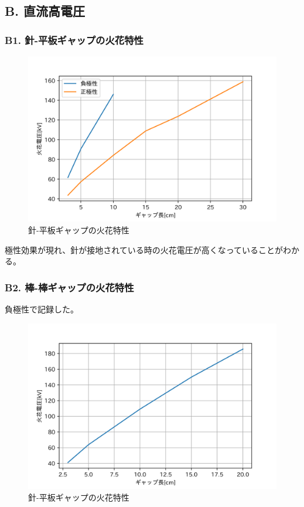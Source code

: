 \documentclass[dvipdfmx, twocolumn]{jsarticle}
\begin{document}
\subsection*{B. 直流高電圧}

\subsubsection*{B1. 針-平板ギャップの火花特性}
\begin{figure}[H]
\begin{center}
\includegraphics[scale = 0.5]{B1.png}
\caption{針-平板ギャップの火花特性}
\end{center}
\end{figure}

極性効果が現れ、針が接地されている時の火花電圧が高くなっていることがわかる。
\subsubsection*{B2. 棒-棒ギャップの火花特性}
負極性で記録した。
\begin{figure}[H]
\begin{center}
\includegraphics[scale = 0.5]{B2.png}
\caption{針-平板ギャップの火花特性}
\end{center}
\end{figure}
\end{document}
